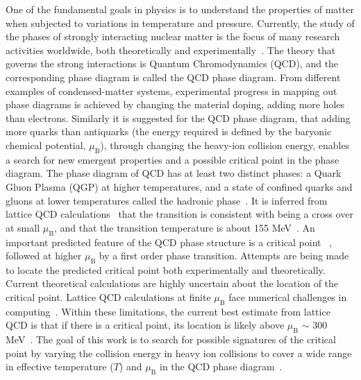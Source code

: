 \documentclass[10pt,aps,prc,twocolumn,floatfix]{revtex4-1}
\begin{document}
One of the fundamental goals in physics is to understand the
properties of matter when subjected to variations in temperature and
pressure. Currently, the study of the phases of strongly
interacting nuclear matter is the focus of many research activities
worldwide, both theoretically and experimentally~\cite{Bzdak:2019pkr,Luo:2017faz}.
The theory that governs the strong interactions is Quantum
Chromodynamics (QCD), and the corresponding phase diagram is
called the QCD phase diagram. From different examples of condensed-matter systems,
experimental progress in mapping out phase diagrams is achieved by
changing the material doping, adding more holes than electrons.
Similarly it is suggested for the QCD phase diagram, that adding more
quarks than antiquarks (the energy required is defined by
the baryonic chemical potential, $\mu_{\mathrm B}$), through changing
the heavy-ion collision energy, enables a search for new emergent
properties and a possible
critical point in the phase diagram.
The phase diagram of QCD has at least two distinct phases: a Quark
Gluon Plasma (QGP) at higher
temperatures, and a state of confined quarks and gluons at lower temperatures called the hadronic
phase~\cite{Fukushima:2010bq, BraunMunzinger:2009zz, Asakawa:1989bq}.
It is inferred from lattice QCD calculations~\cite{Aoki:2006we} that
the transition is consistent with being a cross over at small
$\mu_{\mathrm B}$, and that the transition temperature is about 155 MeV~\cite{Aoki:2009sc,Bazavov:2011nk,Gupta:2011wh}. 
An important predicted feature of the QCD phase structure is a
critical point 
~\cite{Stephanov:2008qz,Stephanov:1999zu}, followed
at higher $\mu_{\mathrm B}$ by a first order phase transition.
Attempts are being made to locate the predicted critical point both 
experimentally and theoretically. Current theoretical 
calculations are highly uncertain about the location of the critical 
point.  Lattice QCD calculations at finite  $\mu_{\mathrm B}$ face 
numerical challenges in computing~\cite{Bazavov:2017tot, Bazavov:2017dus}. Within these limitations, the 
current best estimate from lattice QCD is that if there is a critical
point, its location is likely above $\mu_{\mathrm B}$ $\sim$ 300
MeV~\cite{Bazavov:2017tot, Bazavov:2017dus}.
The goal of this work is to search for possible signatures of the
critical point by varying the collision energy in heavy ion collisions
to cover a wide range in effective temperature  ($T$) and
$\mu_{\mathrm B}$ in the QCD phase diagram~\cite{Stephanov:2011pb}.
\end{document}
